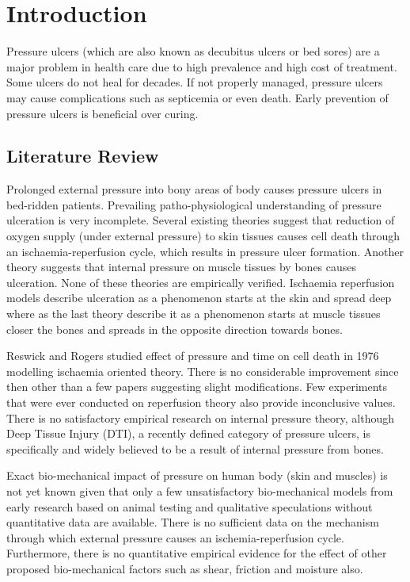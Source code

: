 \chapter{Introduction}
\label{chapter:introduction}

Pressure ulcers (which are also known as decubitus ulcers or bed sores) are a major problem in health care due to high prevalence and high cost of treatment. Some ulcers do not heal for decades. If not properly managed, pressure ulcers may cause complications such as septicemia or even death. Early prevention of pressure ulcers is beneficial over curing. 

\section{Literature Review}
Prolonged external pressure into bony areas of body causes pressure ulcers in bed-ridden patients. Prevailing patho-physiological understanding of pressure ulceration is very incomplete. Several existing theories suggest that reduction of oxygen supply (under external pressure) to skin tissues causes cell death through an ischaemia-reperfusion cycle, which results in pressure ulcer formation. Another theory suggests that internal pressure on muscle tissues by bones causes ulceration. None of these theories are empirically verified. Ischaemia reperfusion models describe ulceration as a phenomenon starts at the skin and spread deep where as the last theory describe it as a phenomenon starts at muscle tissues closer the bones and spreads in the opposite direction towards bones. 

Reswick and Rogers studied effect of pressure and time on cell death in 1976 modelling ischaemia oriented theory. There is no considerable improvement since then other than a few papers suggesting slight modifications. Few experiments that were ever conducted on reperfusion theory also provide inconclusive values. There is no satisfactory empirical research on internal pressure theory, although Deep Tissue Injury (DTI), a recently defined category of pressure ulcers, is specifically and widely believed to be a result of internal pressure from bones. 

Exact bio-mechanical impact of pressure on human body (skin and muscles) is not yet known given that only a few unsatisfactory bio-mechanical models from early research based on animal testing and qualitative speculations without quantitative data are available. There is no sufficient data on the mechanism through which external pressure causes an ischemia-reperfusion cycle. Furthermore, there is no quantitative empirical evidence for the effect of other proposed bio-mechanical factors such as shear, friction and moisture also. 

